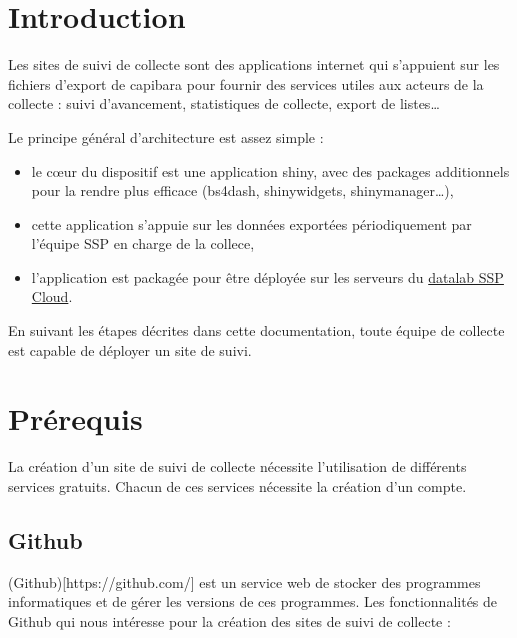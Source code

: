 \documentclass[
  letterpaper,
  DIV=11,
  numbers=noendperiod]{scrreprt}
\providecommand{\tightlist}{%
  \setlength{\itemsep}{0pt}\setlength{\parskip}{0pt}}\usepackage{longtable,booktabs,array}
\begin{document}

\hypertarget{introduction}{%
\chapter{Introduction}\label{introduction}}

Les sites de suivi de collecte sont des applications internet qui
s'appuient sur les fichiers d'export de capibara pour fournir des
services utiles aux acteurs de la collecte : suivi d'avancement,
statistiques de collecte, export de listes\ldots{}

Le principe général d'architecture est assez simple :

\begin{itemize}
\tightlist
\item
  le cœur du dispositif est une application shiny, avec des packages
  additionnels pour la rendre plus efficace (bs4dash, shinywidgets,
  shinymanager\ldots),\\
\item
  cette application s'appuie sur les données exportées périodiquement
  par l'équipe SSP en charge de la collece,\\
\item
  l'application est packagée pour être déployée sur les serveurs du
  \href{https://datalab.sspcloud.fr/}{datalab SSP Cloud}.
\end{itemize}

En suivant les étapes décrites dans cette documentation, toute équipe de
collecte est capable de déployer un site de suivi.


\hypertarget{pruxe9requis}{%
\chapter{Prérequis}\label{pruxe9requis}}

La création d'un site de suivi de collecte nécessite l'utilisation de
différents services gratuits. Chacun de ces services nécessite la
création d'un compte.

\hypertarget{github}{%
\section{Github}\label{github}}

(Github){[}https://github.com/{]} est un service web de stocker des
programmes informatiques et de gérer les versions de ces programmes. Les
fonctionnalités de Github qui nous intéresse pour la création des sites
de suivi de collecte :
\end{document}
